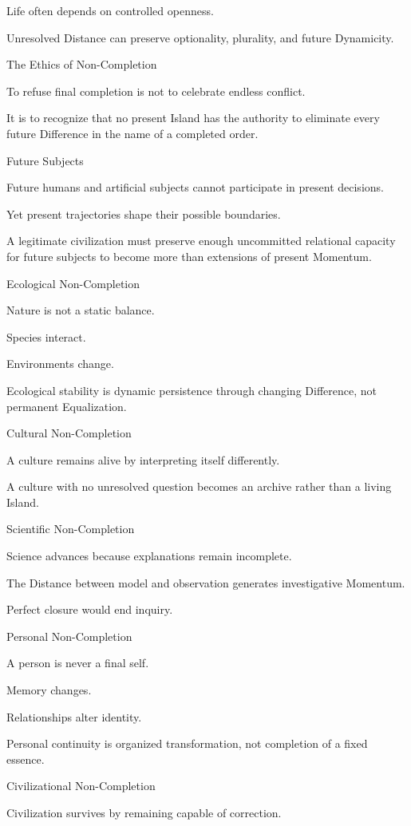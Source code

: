 Life often depends on controlled openness.

Unresolved Distance can preserve optionality, plurality, and future Dynamicity.

The Ethics of Non-Completion

To refuse final completion is not to celebrate endless conflict.

It is to recognize that no present Island has the authority to eliminate every future Difference in the name of a completed order.

Future Subjects

Future humans and artificial subjects cannot participate in present decisions.

Yet present trajectories shape their possible boundaries.

A legitimate civilization must preserve enough uncommitted relational capacity for future subjects to become more than extensions of present Momentum.

Ecological Non-Completion

Nature is not a static balance.

Species interact.

Environments change.

Ecological stability is dynamic persistence through changing Difference, not permanent Equalization.

Cultural Non-Completion

A culture remains alive by interpreting itself differently.

A culture with no unresolved question becomes an archive rather than a living Island.

Scientific Non-Completion

Science advances because explanations remain incomplete.

The Distance between model and observation generates investigative Momentum.

Perfect closure would end inquiry.

Personal Non-Completion

A person is never a final self.

Memory changes.

Relationships alter identity.

Personal continuity is organized transformation, not completion of a fixed essence.

Civilizational Non-Completion

Civilization survives by remaining capable of correction.

